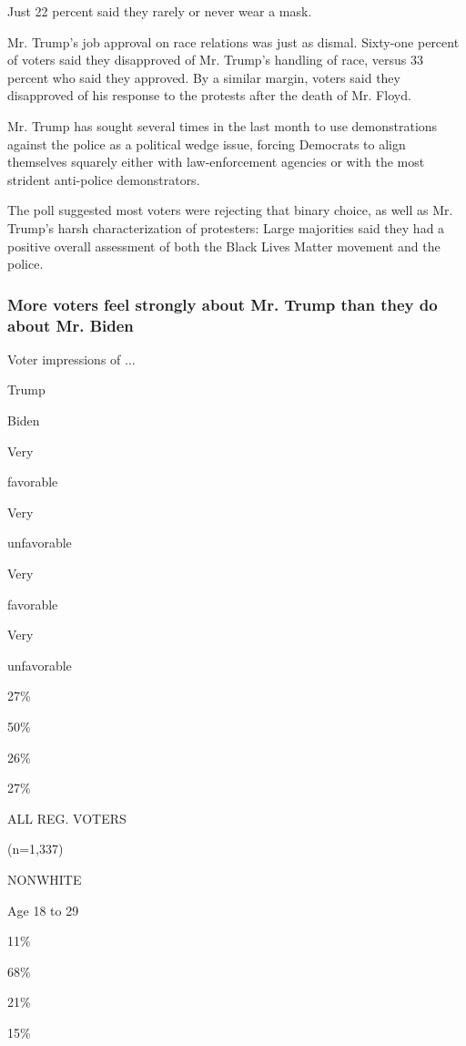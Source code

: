 Just 22 percent said they rarely or never wear a mask.

Mr. Trump's job approval on race relations was just as dismal. Sixty-one
percent of voters said they disapproved of Mr. Trump's handling of race,
versus 33 percent who said they approved. By a similar margin, voters
said they disapproved of his response to the protests after the death of
Mr. Floyd.

Mr. Trump has sought several times in the last month to use
demonstrations against the police as a political wedge issue, forcing
Democrats to align themselves squarely either with law-enforcement
agencies or with the most strident anti-police demonstrators.

The poll suggested most voters were rejecting that binary choice, as
well as Mr. Trump's harsh characterization of protesters: Large
majorities said they had a positive overall assessment of both the Black
Lives Matter movement and the police.

\hypertarget{more-voters-feel-strongly-about-mr-trump-than-they-do-about-mr-biden}{%
\subsubsection{More voters feel strongly about Mr. Trump than they do
about Mr.
Biden}\label{more-voters-feel-strongly-about-mr-trump-than-they-do-about-mr-biden}}

Voter impressions of ...

Trump

Biden

Very

favorable

Very

unfavorable

Very

favorable

Very

unfavorable

27\%

50\%

26\%

27\%

ALL REG. VOTERS

(n=1,337)

NONWHITE

Age 18 to 29

11\%

68\%

21\%

15\%

